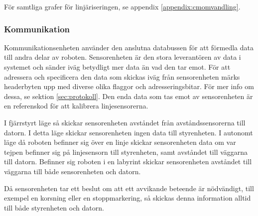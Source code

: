 För samtliga grafer för linjäriseringen, se appendix \ref{appendix:cmomvandling}.


\subsubsection{Kommunikation}
Kommunikationsenheten använder den anslutna databussen för att förmedla 
data till andra delar av roboten. Sensorenheten är den stora leverantören av 
data i systemet och sänder iväg betydligt mer data än vad den tar emot. För att 
adressera och specificera den data som skickas iväg från sensorenheten märks 
headerbyten upp med diverse olika flaggor och adresseringsbitar. För mer info om 
dessa, se sektion \ref{sec:protokoll}. Den enda data som tas emot av sensorenheten är en 
referenskod för att kalibrera linjesensorerna.

I fjärrstyrt läge så skickar sensorenheten avståndet från avståndssensorerna 
till datorn.  I detta läge skickar sensorenheten ingen data till styrenheten. 
I autonomt läge då roboten befinner sig över en linje skickar sensorenheten data om 
var tejpen befinner sig på linjesensorn till styrenheten, samt avståndet till 
väggarna till datorn. Befinner sig roboten i en labyrint skickar 
sensorenheten avståndet till väggarna till både sensorenheten och datorn.  

Då sensorenheten tar ett beslut om att ett avvikande beteende är nödvändigt, till exempel 
en korsning eller en stoppmarkering, så skickas denna information alltid till 
både styrenheten och datorn.


